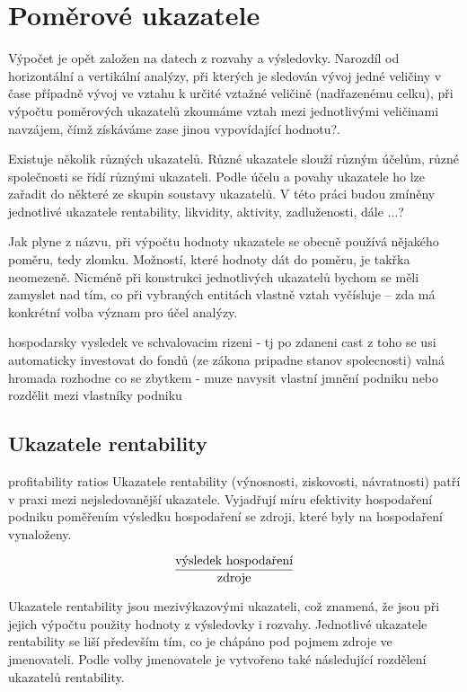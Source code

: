 \section{Poměrové ukazatele}
Výpočet je opět založen na datech z rozvahy a výsledovky. Narozdíl od horizontální a vertikální analýzy, při kterých je sledován vývoj jedné veličiny v čase případně vývoj ve vztahu k určité vztažné veličině (nadřazenému celku), při výpočtu poměrových ukazatelů zkoumáme vztah mezi jednotlivými veličinami navzájem, čímž získáváme zase jinou vypovídající hodnotu?.

Existuje několik různých ukazatelů. Různé ukazatele slouží různým účelům, různé společnosti se řídí různými ukazateli. Podle účelu a povahy ukazatele ho lze zařadit do některé ze skupin soustavy ukazatelů. V této práci budou zmíněny jednotlivé ukazatele rentability, likvidity, aktivity, zadluženosti, dále ...?

Jak plyne z názvu, při výpočtu hodnoty ukazatele se obecně používá nějakého poměru, tedy zlomku. Možností, které hodnoty dát do poměru, je takřka neomezeně. Nicméně při konstrukci jednotlivých ukazatelů bychom se měli zamyslet nad tím, co při vybraných entitách vlastně vztah vyčísluje -- zda má konkrétní volba význam pro účel analýzy\cite{kisling}.

hospodarsky vysledek ve schvalovacim rizeni - tj po zdaneni
cast z toho se usi automaticky investovat do fondů (ze zákona pripadne stanov spolecnosti)
valná hromada rozhodne co se zbytkem - muze navysit vlastní jmnění podniku nebo rozdělit mezi vlastníky podniku

\subsection{Ukazatele rentability}
profitability ratios
Ukazatele rentability (výnosnosti, ziskovosti, návratnosti) patří v praxi mezi nejsledovanější ukazatele. Vyjadřují míru efektivity hospodaření podniku poměřením výsledku hospodaření se zdroji, které byly na hospodaření vynaloženy.

$$\dfrac{\text{výsledek hospodaření}}{\text{zdroje}}$$

Ukazatele rentability jsou mezivýkazovými ukazateli, což znamená, že jsou při jejich výpočtu použity hodnoty z výsledovky i rozvahy. Jednotlivé ukazatele rentability se liší především tím, co je chápáno pod pojmem zdroje ve jmenovateli\cite{mendelu}. Podle volby jmenovatele je vytvořeno také následující rozdělení ukazatelů rentability. 

